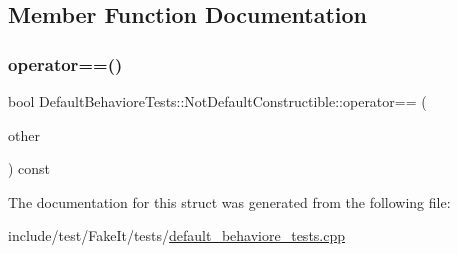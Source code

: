 \subsection{Member Function Documentation}
\mbox{\label{structDefaultBehavioreTests_1_1NotDefaultConstructible_a2cf3251c6f31c6446446b58afcd78e3d}} 
\subsubsection{\texorpdfstring{operator==()}{operator==()}}
{\footnotesize\ttfamily bool Default\+Behaviore\+Tests\+::\+Not\+Default\+Constructible\+::operator== (\begin{DoxyParamCaption}\item[{const \mbox{\hyperlink{structDefaultBehavioreTests_1_1NotDefaultConstructible}{Not\+Default\+Constructible}} \&}]{other }\end{DoxyParamCaption}) const\hspace{0.3cm}{\ttfamily [inline]}}



The documentation for this struct was generated from the following file\+:\begin{DoxyCompactItemize}
\item 
include/test/\+Fake\+It/tests/\mbox{\hyperlink{default__behaviore__tests_8cpp}{default\+\_\+behaviore\+\_\+tests.\+cpp}}\end{DoxyCompactItemize}
